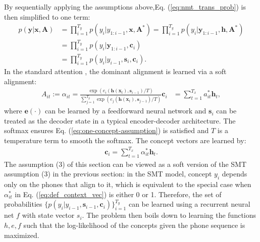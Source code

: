 \documentclass[journal]{IEEEtran}
\begin{document}
By sequentially applying the assumptions above,Eq. (\ref{eq:nmt_trans_prob}) is then simplified to one term:
\begin{align}\label{eq:nmt_trans_prob_simplify}
    p(\mathbf y|\mathbf x, \mathbf A)&= \prod_{i=1}^{T_y} p(y_i|y_{1:i-1}, \mathbf{x}, \mathbf{A}^*) = \prod_{i=1}^{T_y} p(y_i|\mathbf y_{1:i-1}, \mathbf h, \mathbf{A}^*)\\
    &= \prod_{i=1}^{T_y} p(y_i|\mathbf y_{1:i-1}, \mathbf c_i)\\
    &= \prod_{i=1}^{T_y} p(y_i|y_{i-1}, \mathbf s_i, \mathbf c_i).
\end{align}
In the standard attention \cite{Bahdanau14}, the dominant alignment is learned via a soft alignment:
\begin{align}\label{eq:def_soft_align}
    A_{it}:= \alpha_{it} = \frac{\exp(e_i(\mathbf h(\mathbf x_t), \mathbf s_{i-1})/T)}{\sum_{j=1}^{T_y} \exp(e_j(\mathbf h(\mathbf{x}_t), \mathbf s_{j-1})/T)}
    \mathbf{c}_i &= \sum_{t=1}^{T_x} a^*_{it} \mathbf{h}_{t},
\end{align}
where $\mathbf e(\cdot)$ can be learned by a feedforward neural network and $\mathbf s_i$ can be treated as the decoder state in a typical encoder-decoder architecture. The softmax ensures Eq. (\ref{eq:one-concept-assumption}) is satisfied and $T$ is a temperature term to smooth the softmax. The concept vectors are learned by:
\begin{align}\label{eq:def_context_vec}
    \mathbf c_i = \sum_{t=1}^{T_x} \alpha_{it}^* \mathbf h_t.
\end{align}
The assumption (3) of this section can be viewed as a soft version of the SMT assumption (3) in the previous section:  in the SMT model, concept $y_i$ depends only on the phones that align to it, which is equivalent to the special case when $\alpha_{it}^*$ in Eq. (\ref{eq:def_context_vec}) is either 0 or 1. Therefore, the set of probabilities $\{p(y_i|y_{i-1}, \mathbf s_{i-1}, \mathbf c_i)\}_{i=1}^{T_y}$ can be learned using a recurrent neural net $f$ with state vector $s_i$. The problem then boils down to learning the functions $h, e, f$ such that the log-likelihood of the concepts given the phone sequence is maximized.

\end{document}
